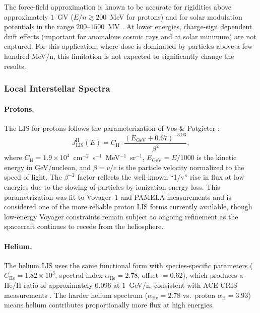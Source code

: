 The force-field approximation is known to be accurate for rigidities above
approximately $1$~GV ($E/n \gtrsim 200$~MeV for protons) and for solar
modulation potentials in the range $200$--$1500$~MV \citep{usoskin2017}.
At lower energies, charge-sign dependent drift effects (important for
anomalous cosmic rays and at solar minimum) are not captured.
For this application, where dose is dominated by particles above a few
hundred MeV/n, this limitation is not expected to significantly change
the results.

\subsubsection{Local Interstellar Spectra}
\label{sec:lis}

\paragraph{Protons.}
The LIS for protons follows the parameterization of Vos \& Potgieter \cite{vos2015}:
\begin{equation}
  J_\mathrm{LIS}^\mathrm{H}(E) = C_\mathrm{H}
  \cdot \frac{(E_\mathrm{GeV} + 0.67)^{-3.93}}{\beta^2},
  \label{eq:lis_proton}
\end{equation}
where $C_\mathrm{H} = 1.9 \times 10^4$~cm$^{-2}$~s$^{-1}$~MeV$^{-1}$~sr$^{-1}$,
$E_\mathrm{GeV} = E / 1000$ is the kinetic energy in GeV/nucleon, and
$\beta = v/c$ is the particle velocity normalized to the speed of light.
The $\beta^{-2}$ factor reflects the well-known ``1/v'' rise in flux at
low energies due to the slowing of particles by ionization energy loss.
This parametrization was fit to Voyager~1 and PAMELA measurements and
is considered one of the more reliable proton LIS forms currently available,
though low-energy Voyager constraints remain subject to ongoing refinement
as the spacecraft continues to recede from the heliosphere.

\paragraph{Helium.}
The helium LIS uses the same functional form with species-specific parameters
($C_\mathrm{He} = 1.82 \times 10^3$, spectral index $\alpha_\mathrm{He} = 2.78$,
offset $= 0.62$), which produces a He/H ratio of approximately $0.096$ at
$1$~GeV/n, consistent with ACE CRIS measurements \citep{stone1998}.
The harder helium spectrum ($\alpha_\mathrm{He} = 2.78$ vs.\ proton
$\alpha_\mathrm{H} = 3.93$) means helium contributes proportionally more
flux at high energies.

